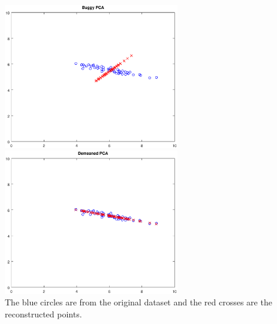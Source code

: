 \includegraphics[width=3in]{pcaprog/buggy_pca} \hspace{0.4in}
\includegraphics[width=3in]{pcaprog/demeaned_pca} \\
The blue circles are from the original dataset and the red crosses are the reconstructed points.

